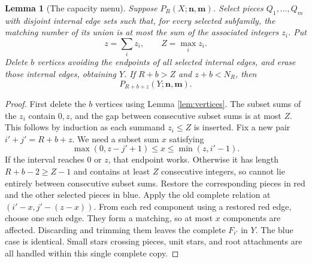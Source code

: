 \documentclass[11pt,a4paper]{article}
\newcommand{\nn}{\mathbf n}\newcommand{\mm}{\mathbf m}
\newtheorem{lemma}[theorem]{Lemma}
\theoremstyle{definition}
\begin{document}
\begin{lemma}[The capacity menu]\label{lem:menu}
Suppose $P_R(X;\nn,\mm)$. Select pieces $Q_1,\ldots,Q_m$ with disjoint internal edge sets such that, for every selected subfamily, the matching number of its union is at most the sum of the associated integers $z_i$. Put
\[
z=\sum_i z_i,\qquad Z=\max_i z_i.
\]
Delete $b$ vertices avoiding the endpoints of all selected internal edges, and erase those internal edges, obtaining $Y$. If $R+b>Z$ and $z+b<N_R$, then
\[
P_{R+b+z}(Y;\nn,\mm).
\]
\end{lemma}
\begin{proof}
First delete the $b$ vertices using Lemma \ref{lem:vertices}. The subset sums of the $z_i$ contain $0,z$, and the gap between consecutive subset sums is at most $Z$. This follows by induction as each summand $z_i\le Z$ is inserted.
Fix a new pair $i'+j'=R+b+z$. We need a subset sum $x$ satisfying
\begin{equation}\label{eq:menuinterval}
\max(0,z-j'+1)\le x\le\min(z,i'-1).
\end{equation}
If the interval reaches $0$ or $z$, that endpoint works. Otherwise it has length $R+b-2\ge Z-1$ and contains at least $Z$ consecutive integers, so cannot lie entirely between consecutive subset sums.
Restore the corresponding pieces in red and the other selected pieces in blue. Apply the old complete relation at
$(i'-x,j'-(z-x))$. From each red component using a restored red edge, choose one such edge. They form a matching, so at most $x$ components are affected. Discarding and trimming them leaves the complete $F_{i'}$ in $Y$. The blue case is identical. Small stars crossing pieces, unit stars, and root attachments are all handled within this single complete copy.
\end{proof}
\end{document}
